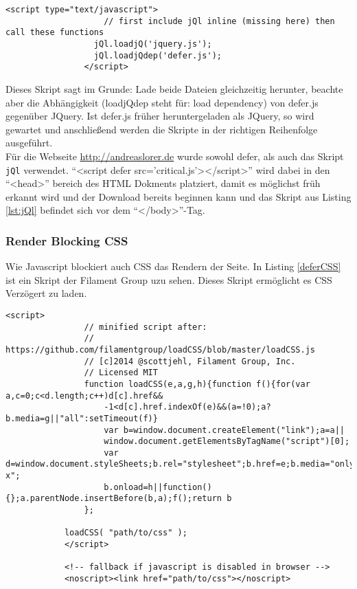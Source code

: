 			\begin{lstlisting}[captionpos=b, caption=jQl asynchronous jQuery-Loader, label=lst:jQl]
				<script type="text/javascript">
					// first include jQl inline (missing here) then call these functions
				  jQl.loadjQ('jquery.js');
				  jQl.loadjQdep('defer.js');
				</script>
			\end{lstlisting}

			Dieses Skript sagt im Grunde: Lade beide Dateien gleichzeitig herunter, beachte aber die Abhängigkeit (loadjQdep steht für: load dependency) von defer.js gegenüber JQuery. Ist defer.js früher heruntergeladen als JQuery, so wird gewartet und anschließend werden die Skripte in der richtigen Reihenfolge ausgeführt.\\

			Für die Webseite \url{http://andreaslorer.de} wurde sowohl defer, als auch das Skript \texttt{jQl} verwendet. "`<script defer src='critical.js'></script>"' wird dabei in den "`<head>"' bereich des HTML Dokments platziert, damit es möglichst früh erkannt wird und der Download bereits beginnen kann und das Skript aus Listing \ref{lst:jQl} befindet sich vor dem "`</body>"'-Tag.

			\pagebreak


		\subsubsection{Render Blocking CSS} %
		\label{ssub:render_blocking_css}
			Wie Javascript blockiert auch CSS das Rendern der Seite. In Listing \ref{deferCSS} ist ein Skript der Filament Group uzu sehen. Dieses Skript ermöglicht es CSS Verzögert zu laden. 

			\begin{lstlisting}[captionpos=b, caption=load a CSS file asynchronously, label=lst:deferCSS, breaklines=false]
			<script>
				// minified script after: 
				// https://github.com/filamentgroup/loadCSS/blob/master/loadCSS.js
				// [c]2014 @scottjehl, Filament Group, Inc.
				// Licensed MIT
	 			function loadCSS(e,a,g,h){function f(){for(var a,c=0;c<d.length;c++)d[c].href&&
	 				-1<d[c].href.indexOf(e)&&(a=!0);a?b.media=g||"all":setTimeout(f)}
	 				var b=window.document.createElement("link");a=a||
	 				window.document.getElementsByTagName("script")[0];
	 				var d=window.document.styleSheets;b.rel="stylesheet";b.href=e;b.media="only x";
	 				b.onload=h||function(){};a.parentNode.insertBefore(b,a);f();return b
	 			};

	  		loadCSS( "path/to/css" );
			</script>

			<!-- fallback if javascript is disabled in browser -->
			<noscript><link href="path/to/css"></noscript>
			\end{lstlisting}


